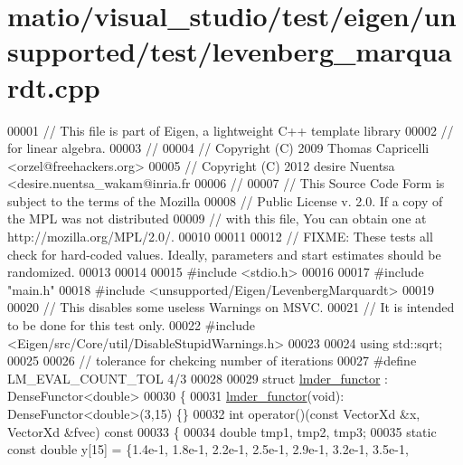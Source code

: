 \hypertarget{matio_2visual__studio_2test_2eigen_2unsupported_2test_2levenberg__marquardt_8cpp_source}{}\section{matio/visual\+\_\+studio/test/eigen/unsupported/test/levenberg\+\_\+marquardt.cpp}
\label{matio_2visual__studio_2test_2eigen_2unsupported_2test_2levenberg__marquardt_8cpp_source}

\begin{DoxyCode}
00001 \textcolor{comment}{// This file is part of Eigen, a lightweight C++ template library}
00002 \textcolor{comment}{// for linear algebra.}
00003 \textcolor{comment}{//}
00004 \textcolor{comment}{// Copyright (C) 2009 Thomas Capricelli <orzel@freehackers.org>}
00005 \textcolor{comment}{// Copyright (C) 2012 desire Nuentsa <desire.nuentsa\_wakam@inria.fr}
00006 \textcolor{comment}{//}
00007 \textcolor{comment}{// This Source Code Form is subject to the terms of the Mozilla}
00008 \textcolor{comment}{// Public License v. 2.0. If a copy of the MPL was not distributed}
00009 \textcolor{comment}{// with this file, You can obtain one at http://mozilla.org/MPL/2.0/.}
00010 
00011 
00012 \textcolor{comment}{// FIXME: These tests all check for hard-coded values. Ideally, parameters and start estimates should be
       randomized.}
00013 
00014 
00015 \textcolor{preprocessor}{#include <stdio.h>}
00016 
00017 \textcolor{preprocessor}{#include "main.h"}
00018 \textcolor{preprocessor}{#include <unsupported/Eigen/LevenbergMarquardt>}
00019 
00020 \textcolor{comment}{// This disables some useless Warnings on MSVC.}
00021 \textcolor{comment}{// It is intended to be done for this test only.}
00022 \textcolor{preprocessor}{#include <Eigen/src/Core/util/DisableStupidWarnings.h>}
00023 
00024 \textcolor{keyword}{using} std::sqrt;
00025 
00026 \textcolor{comment}{// tolerance for chekcing number of iterations}
00027 \textcolor{preprocessor}{#define LM\_EVAL\_COUNT\_TOL 4/3}
00028 
00029 \textcolor{keyword}{struct }\hyperlink{structlmder__functor}{lmder\_functor} : DenseFunctor<double>
00030 \{
00031     \hyperlink{structlmder__functor}{lmder\_functor}(\textcolor{keywordtype}{void}): DenseFunctor<double>(3,15) \{\}
00032     \textcolor{keywordtype}{int} operator()(\textcolor{keyword}{const} VectorXd &x, VectorXd &fvec)\textcolor{keyword}{ const}
00033 \textcolor{keyword}{    }\{
00034         \textcolor{keywordtype}{double} tmp1, tmp2, tmp3;
00035         \textcolor{keyword}{static} \textcolor{keyword}{const} \textcolor{keywordtype}{double} y[15] = \{1.4e-1, 1.8e-1, 2.2e-1, 2.5e-1, 2.9e-1, 3.2e-1, 3.5e-1,

\end{DoxyCode}
